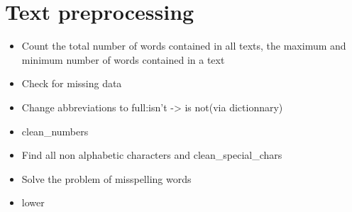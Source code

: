 \documentclass{amsart}
\begin{document}
\section{Text preprocessing}
\begin{itemize}
  \item Count the total number of words contained in all texts, the maximum and minimum number of words contained in a text
  \item Check for missing data
  \item Change abbreviations to full:isn't -> is not(via dictionnary)
  \item clean_numbers
  \item Find all non alphabetic characters and clean_special_chars
  \item Solve the problem of misspelling words
  \item lower
\end{itemize}
\par
\end{document}

